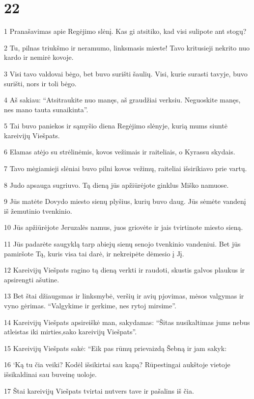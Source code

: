 \chapter{22}


\par 1 Pranašavimas apie Regėjimo slėnį. Kas gi atsitiko, kad visi sulipote ant stogų? 
\par 2 Tu, pilnas triukšmo ir neramumo, linksmasis mieste! Tavo kritusieji nekrito nuo kardo ir nemirė kovoje. 
\par 3 Visi tavo valdovai bėgo, bet buvo surišti šaulių. Visi, kurie surasti tavyje, buvo surišti, nors ir toli bėgo. 
\par 4 Aš sakiau: “Atsitraukite nuo manęs, aš graudžiai verksiu. Neguoskite manęs, nes mano tauta sunaikinta”. 
\par 5 Tai buvo paniekos ir sąmyšio diena Regėjimo slėnyje, kurią mums siuntė kareivijų Viešpats. 
\par 6 Elamas atėjo su strėlinėmis, kovos vežimais ir raiteliais, o Kyras­su skydais. 
\par 7 Tavo mėgiamieji slėniai buvo pilni kovos vežimų, raiteliai išsirikiavo prie vartų. 
\par 8 Judo apsauga sugriuvo. Tą dieną jūs apžiūrėjote ginklus Miško namuose. 
\par 9 Jūs matėte Dovydo miesto sienų plyšius, kurių buvo daug. Jūs sėmėte vandenį iš žemutinio tvenkinio. 
\par 10 Jūs apžiūrėjote Jeruzalės namus, juos griovėte ir jais tvirtinote miesto sieną. 
\par 11 Jūs padarėte saugyklą tarp abiejų sienų senojo tvenkinio vandeniui. Bet jūs pamiršote Tą, kuris visa tai darė, ir nekreipėte dėmesio į Jį. 
\par 12 Kareivijų Viešpats ragino tą dieną verkti ir raudoti, skustis galvos plaukus ir apsirengti ašutine. 
\par 13 Bet štai džiaugsmas ir linksmybė, veršių ir avių pjovimas, mėsos valgymas ir vyno gėrimas. “Valgykime ir gerkime, nes rytoj mirsime”. 
\par 14 Kareivijų Viešpats apsireiškė man, sakydamas: “Šitas nusikaltimas jums nebus atleistas iki mirties,­sako kareivijų Viešpats”. 
\par 15 Kareivijų Viešpats sakė: “Eik pas rūmų prievaizdą Šebną ir jam sakyk: 
\par 16 ‘Ką tu čia veiki? Kodėl išsikirtai sau kapą? Rūpestingai aukštoje vietoje išsikaldinai sau buveinę uoloje. 
\par 17 Štai kareivijų Viešpats tvirtai nutvers tave ir pašalins iš čia. 
